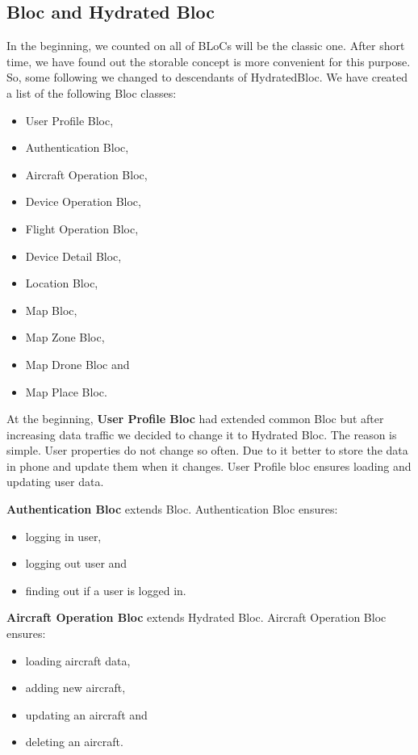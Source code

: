 \subsection{Bloc and Hydrated Bloc}\label{subsec:bloc-and-hydrated-bloc}
In the beginning, we counted on all of BLoCs will be the classic one.
After short time, we have found out the storable concept is more convenient for this purpose.
So, some following we changed to descendants of HydratedBloc.
We have created a list of the following Bloc classes:
\begin{itemize}
    \item User Profile Bloc,
    \item Authentication Bloc,
    \item Aircraft Operation Bloc,
    \item Device Operation Bloc,
    \item Flight Operation Bloc,
    \item Device Detail Bloc,
    \item Location Bloc,
    \item Map Bloc,
    \item Map Zone Bloc,
    \item Map Drone Bloc and
    \item Map Place Bloc.
\end{itemize}

At the beginning, \textbf{User Profile Bloc} had extended common Bloc but after increasing data traffic we decided to change it to Hydrated Bloc.
The reason is simple.
User properties do not change so often.
Due to it better to store the data in phone and update them when it changes.
User Profile bloc ensures loading and updating user data.

\textbf{Authentication Bloc} extends Bloc.
Authentication Bloc ensures:
\begin{itemize}
    \item logging in user,
    \item logging out user and
    \item finding out if a user is logged in.
\end{itemize}

\textbf{Aircraft Operation Bloc} extends Hydrated Bloc.
Aircraft Operation Bloc ensures:
\begin{itemize}
    \item loading aircraft data,
    \item adding new aircraft,
    \item updating an aircraft and
    \item deleting an aircraft.
\end{itemize}

